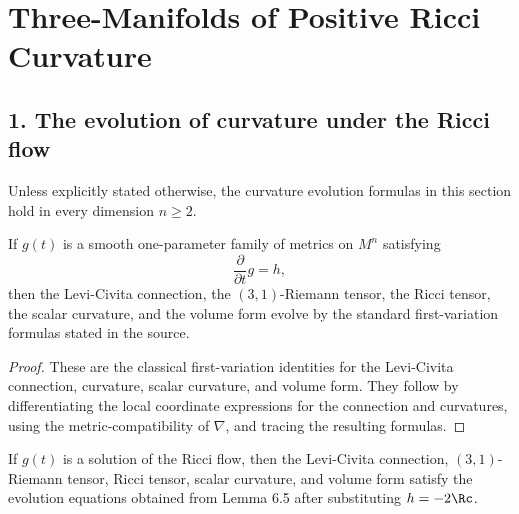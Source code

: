 \chapter{Three-Manifolds of Positive Ricci Curvature}

\section*{1. The evolution of curvature under the Ricci flow}

\begin{remark}
\label{ch06-rem-evolution-formulas-dimension-independent}
Unless explicitly stated otherwise, the curvature evolution formulas in this section hold in every dimension \(n \ge 2\).
\end{remark}

\begin{lemma}
\label{ch06-lem-general-metric-variation}
If \(g(t)\) is a smooth one-parameter family of metrics on \(M^n\) satisfying
\[
\frac{\partial}{\partial t}g=h,
\]
then the Levi-Civita connection, the \((3,1)\)-Riemann tensor, the Ricci tensor, the scalar curvature, and the volume form evolve by the standard first-variation formulas stated in the source.
\end{lemma}

\begin{proof}
\sketch These are the classical first-variation identities for the Levi-Civita connection, curvature, scalar curvature, and volume form. They follow by differentiating the local coordinate expressions for the connection and curvatures, using the metric-compatibility of \(\nabla\), and tracing the resulting formulas.
\end{proof}

\begin{corollary}
\label{ch06-cor-curvature-evolution-under-ricci-flow}
If \(g(t)\) is a solution of the Ricci flow, then the Levi-Civita connection, \((3,1)\)-Riemann tensor, Ricci tensor, scalar curvature, and volume form satisfy the evolution equations obtained from Lemma 6.5 after substituting \(h=-2\Rc\).
\end{corollary}

